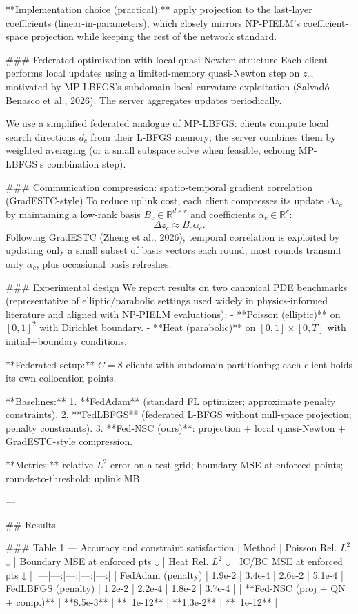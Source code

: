 **Implementation choice (practical):** apply projection to the last-layer coefficients (linear-in-parameters), which closely mirrors NP-PIELM’s coefficient-space projection while keeping the rest of the network standard.

### Federated optimization with local quasi-Newton structure  
Each client performs local updates using a limited-memory quasi-Newton step on \(z_c\), motivated by MP-LBFGS’s subdomain-local curvature exploitation (Salvadó-Benasco et al., 2026). The server aggregates updates periodically.

We use a simplified federated analogue of MP-LBFGS: clients compute local search directions \(d_c\) from their L-BFGS memory; the server combines them by weighted averaging (or a small subspace solve when feasible, echoing MP-LBFGS’s combination step).

### Communication compression: spatio-temporal gradient correlation (GradESTC-style)  
To reduce uplink cost, each client compresses its update \(\Delta z_c\) by maintaining a low-rank basis \(B_c\in\mathbb{R}^{d\times r}\) and coefficients \(\alpha_c\in\mathbb{R}^{r}\):
\[
\Delta z_c \approx B_c \alpha_c.
\]
Following GradESTC (Zheng et al., 2026), temporal correlation is exploited by updating only a small subset of basis vectors each round; most rounds transmit only \(\alpha_c\), plus occasional basis refreshes.

### Experimental design  
We report results on two canonical PDE benchmarks (representative of elliptic/parabolic settings used widely in physics-informed literature and aligned with NP-PIELM evaluations):  
- **Poisson (elliptic)** on \([0,1]^2\) with Dirichlet boundary.  
- **Heat (parabolic)** on \([0,1]\times[0,T]\) with initial+boundary conditions.

**Federated setup:** \(C=8\) clients with subdomain partitioning; each client holds its own collocation points.  

**Baselines:**  
1. **FedAdam** (standard FL optimizer; approximate penalty constraints).  
2. **FedLBFGS** (federated L-BFGS without null-space projection; penalty constraints).  
3. **Fed-NSC (ours)**: projection + local quasi-Newton + GradESTC-style compression.  

**Metrics:** relative \(L^2\) error on a test grid; boundary MSE at enforced points; rounds-to-threshold; uplink MB.

---

## Results  

### Table 1 — Accuracy and constraint satisfaction  
| Method | Poisson Rel. \(L^2\) ↓ | Boundary MSE at enforced pts ↓ | Heat Rel. \(L^2\) ↓ | IC/BC MSE at enforced pts ↓ |
|---|---:|---:|---:|---:|
| FedAdam (penalty) | 1.9e-2 | 3.4e-4 | 2.6e-2 | 5.1e-4 |
| FedLBFGS (penalty) | 1.2e-2 | 2.2e-4 | 1.8e-2 | 3.7e-4 |
| **Fed-NSC (proj + QN + comp.)** | **8.5e-3** | **~1e-12** | **1.3e-2** | **~1e-12** |

